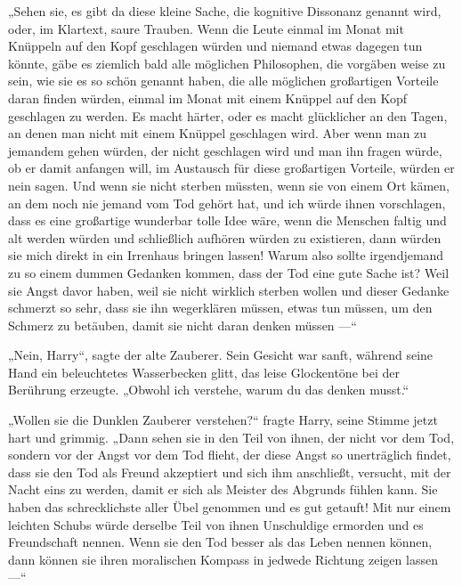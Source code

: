 „Sehen sie, es gibt da diese kleine Sache, die kognitive Dissonanz genannt wird, oder, im Klartext, saure Trauben. Wenn die Leute einmal im Monat mit Knüppeln auf den Kopf geschlagen würden und niemand etwas dagegen tun könnte, gäbe es ziemlich bald alle möglichen Philosophen, die vorgäben weise zu sein, wie sie es so schön genannt haben, die alle möglichen großartigen Vorteile daran finden würden, einmal im Monat mit einem Knüppel auf den Kopf geschlagen zu werden. Es macht härter, oder es macht glücklicher an den Tagen, an denen man nicht mit einem Knüppel geschlagen wird. Aber wenn man zu jemandem gehen würden, der nicht geschlagen wird und man ihn fragen würde, ob er damit anfangen will, im Austausch für diese großartigen Vorteile, würden er nein sagen. Und wenn sie nicht sterben müssten, wenn sie von einem Ort kämen, an dem noch nie jemand vom Tod gehört hat, und ich würde ihnen vorschlagen, dass es eine großartige wunderbar tolle Idee wäre, wenn die Menschen faltig und alt werden würden und schließlich aufhören würden zu existieren, dann würden sie mich direkt in ein Irrenhaus bringen lassen! Warum also sollte irgendjemand zu so einem dummen Gedanken kommen, dass der Tod eine gute Sache ist? Weil sie Angst davor haben, weil sie nicht wirklich sterben wollen und dieser Gedanke schmerzt so sehr, dass sie ihn wegerklären müssen, etwas tun müssen, um den Schmerz zu betäuben, damit sie nicht daran denken müssen —“

„Nein, Harry“, sagte der alte Zauberer. Sein Gesicht war sanft, während seine Hand ein beleuchtetes Wasserbecken glitt, das leise Glockentöne bei der Berührung erzeugte.
„Obwohl ich verstehe, warum du das denken musst.“

„Wollen sie die Dunklen Zauberer verstehen?“ fragte Harry, seine Stimme jetzt hart und grimmig.
„Dann sehen sie in den Teil von ihnen, der nicht vor dem Tod, sondern vor der Angst vor dem Tod flieht, der diese Angst so unerträglich findet, dass sie den Tod als Freund akzeptiert und sich ihm anschließt, versucht, mit der Nacht eins zu werden, damit er sich als Meister des Abgrunds fühlen kann. Sie haben das schrecklichste aller Übel genommen und es gut getauft! Mit nur einem leichten Schubs würde derselbe Teil von ihnen Unschuldige ermorden und es Freundschaft nennen. Wenn sie den Tod besser als das Leben nennen können, dann können sie ihren moralischen Kompass in jedwede Richtung zeigen lassen —“

